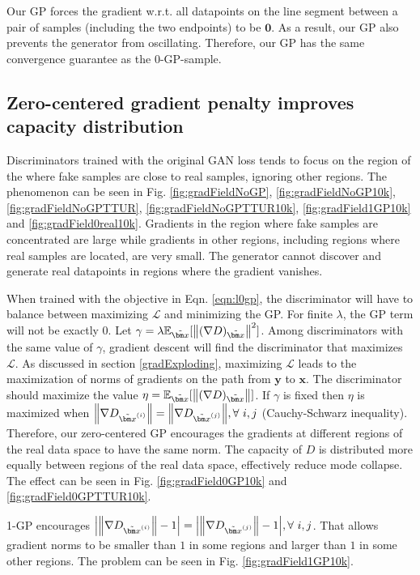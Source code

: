 \documentclass{article} %
\begin{document}
Our GP forces the gradient w.r.t. all datapoints on the line segment between a pair of samples (including the two endpoints) to be $\bm 0$. As a result, our GP also prevents the generator from oscillating. Therefore, our GP has the same convergence guarantee as the 0-GP-sample.
\subsection{Zero-centered gradient penalty improves capacity distribution}
Discriminators trained with the original GAN loss tends to focus on the region of the where fake samples are close to real samples, ignoring other regions. The phenomenon can be seen in Fig. \ref{fig:gradFieldNoGP}, \ref{fig:gradFieldNoGP10k}, \ref{fig:gradFieldNoGPTTUR}, \ref{fig:gradFieldNoGPTTUR10k}, \ref{fig:gradField1GP10k} and \ref{fig:gradField0real10k}. Gradients in the region where fake samples are concentrated are large while gradients in other regions, including regions where real samples are located, are very small. The generator cannot discover and generate real datapoints in regions where the gradient vanishes.

When trained with the objective in Eqn. \ref{eqn:l0gp}, the discriminator will have to balance between maximizing $\mathcal{L}$ and minimizing the GP. For finite $\lambda$, the GP term will not be exactly 0. Let $\gamma = \lambda \mathbb{E}_{\tilde{\bm x}}[\norm{(\nabla D)_{\tilde{\bm x}}}^2]$. Among discriminators with the same value of $\gamma$, gradient descent will find the discriminator that maximizes $\mathcal{L}$. As discussed in section \ref{gradExploding}, maximizing $\mathcal{L}$ leads to the maximization of norms of gradients on the path from $\bm y$ to $\bm x$. The discriminator should maximize the value
$ \eta = \mathbb{E}_{\tilde{\bm x}}[\norm{(\nabla D)_{\tilde{\bm x}}}] $.
If $\gamma$ is fixed then $\eta$ is maximized when $\norm{\nabla D_{\tilde{\bm x}^{(i)}}} = \norm{\nabla D_{\tilde{\bm x}^{(j)}}}, \forall \ i, j$ (Cauchy-Schwarz inequality). Therefore, our zero-centered GP encourages the gradients at different regions of the real data space to have the same norm. The capacity of $D$ is distributed more equally between regions of the real data space, effectively reduce mode collapse. The effect can be seen in Fig. \ref{fig:gradField0GP10k} and \ref{fig:gradField0GPTTUR10k}.

1-GP encourages $\abs{\norm{\nabla D_{\tilde{\bm x}^{(i)}}} - 1} = \abs{\norm{\nabla D_{\tilde{\bm x}^{(j)}}} - 1}, \forall \ i, j$. That allows gradient norms to be smaller than $1$ in some regions and larger than $1$ in some other regions. The problem can be seen in Fig. \ref{fig:gradField1GP10k}.
\end{document}

